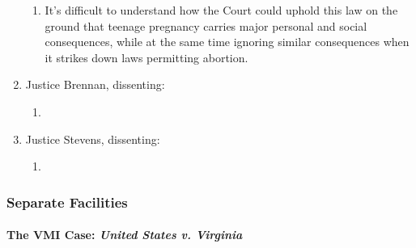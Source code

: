 \begin{enumerate}
    \begin{enumerate}
        \item It's difficult to understand how the Court could uphold this law 
        on the ground that teenage pregnancy carries major personal and social 
        consequences, while at the same time ignoring similar consequences 
        when it strikes down laws permitting abortion.
    \end{enumerate}
    \item Justice Brennan, dissenting:
    \begin{enumerate}
        \item %
    \end{enumerate}
    \item Justice Stevens, dissenting:
    \begin{enumerate}
        \item %
    \end{enumerate}
\end{enumerate}

\subsubsection{Separate Facilities}

\paragraph{The VMI Case: \emph{United States v. Virginia}}


